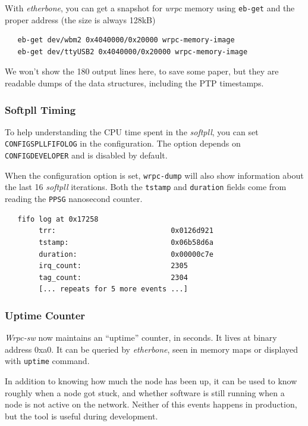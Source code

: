 \documentclass[a4paper, 12pt]{article}
\renewcommand{\_}{\underscore\allowbreak}
\begin{document}
With \textit{etherbone}, you can get a snapshot for \textit{wrpc} memory using
\texttt{eb-get} and the proper address (the size is always 128kB)

\begin{lstlisting}
   eb-get dev/wbm2 0x4040000/0x20000 wrpc-memory-image
   eb-get dev/ttyUSB2 0x4040000/0x20000 wrpc-memory-image
\end{lstlisting}

We won't show the 180 output lines here, to save some paper, but they
are readable dumps of the data structures, including the PTP timestamps.

\subsubsection{Softpll Timing}
\label{spll Softpll Timing}

To help understanding the CPU time spent in the \textit{softpll}, you can
set \texttt{CONFIG\_SPLL\_FIFO\_LOG} in the configuration. The option
depends on \texttt{CONFIG\_DEVELOPER} and is disabled by default.

When the configuration option is set, \texttt{wrpc-dump} will also show
information about the last 16 \textit{softpll} iterations. Both the \texttt{tstamp}
and \texttt{duration} fields come from reading the \texttt{PPSG} nanosecond counter.

\begin{lstlisting}
   fifo log at 0x17258
        trr:                           0x0126d921
        tstamp:                        0x06b58d6a
        duration:                      0x00000c7e
        irq_count:                     2305
        tag_count:                     2304
        [... repeats for 5 more events ...]
\end{lstlisting}

\subsubsection{Uptime Counter}
\label{Uptime Counter}

\textit{Wrpc-sw} now maintains an ``uptime'' counter, in seconds. It lives
at binary address 0xa0. It can be queried by \textit{etherbone},
seen in memory maps or displayed with \texttt{uptime} command.

In addition to knowing how much the node has been up, it can be used to
know roughly when a node got stuck, and whether software is still
running when a node is not active on the network. Neither of this events
happens in production, but the tool is useful during development.
\end{document}
